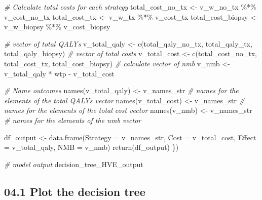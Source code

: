 \documentclass[
]{article}
\newenvironment{Shaded}{\begin{snugshade}}{\end{snugshade}}
\newcommand{\AttributeTok}[1]{\textcolor[rgb]{0.77,0.63,0.00}{#1}}
\newcommand{\CommentTok}[1]{\textcolor[rgb]{0.56,0.35,0.01}{\textit{#1}}}
\newcommand{\FunctionTok}[1]{\textcolor[rgb]{0.00,0.00,0.00}{#1}}
\newcommand{\NormalTok}[1]{#1}
\newcommand{\OtherTok}[1]{\textcolor[rgb]{0.56,0.35,0.01}{#1}}
\newcommand{\SpecialCharTok}[1]{\textcolor[rgb]{0.00,0.00,0.00}{#1}}
\begin{document}
\begin{Shaded}
\begin{Highlighting}[]
  \CommentTok{\# Calculate total costs for each strategy }
\NormalTok{  total\_cost\_no\_tx  }\OtherTok{\textless{}{-}}\NormalTok{ v\_w\_no\_tx  }\SpecialCharTok{\%*\%}\NormalTok{ v\_cost\_no\_tx    }
\NormalTok{  total\_cost\_tx     }\OtherTok{\textless{}{-}}\NormalTok{ v\_w\_tx     }\SpecialCharTok{\%*\%}\NormalTok{ v\_cost\_tx}
\NormalTok{  total\_cost\_biopsy }\OtherTok{\textless{}{-}}\NormalTok{ v\_w\_biopsy }\SpecialCharTok{\%*\%}\NormalTok{ v\_cost\_biopsy}
  
  \CommentTok{\# vector of total QALYs}
\NormalTok{  v\_total\_qaly }\OtherTok{\textless{}{-}} \FunctionTok{c}\NormalTok{(total\_qaly\_no\_tx, total\_qaly\_tx, total\_qaly\_biopsy) }
  \CommentTok{\# vector of total costs}
\NormalTok{  v\_total\_cost }\OtherTok{\textless{}{-}} \FunctionTok{c}\NormalTok{(total\_cost\_no\_tx, total\_cost\_tx, total\_cost\_biopsy) }
  \CommentTok{\# calculate vector of nmb}
\NormalTok{  v\_nmb        }\OtherTok{\textless{}{-}}\NormalTok{ v\_total\_qaly }\SpecialCharTok{*}\NormalTok{ wtp }\SpecialCharTok{{-}}\NormalTok{ v\_total\_cost                      }
  
  \CommentTok{\# Name outcomes}
  \FunctionTok{names}\NormalTok{(v\_total\_qaly) }\OtherTok{\textless{}{-}}\NormalTok{ v\_names\_str  }\CommentTok{\# names for the elements of the total QALYs vector}
  \FunctionTok{names}\NormalTok{(v\_total\_cost) }\OtherTok{\textless{}{-}}\NormalTok{ v\_names\_str  }\CommentTok{\# names for the elements of the total cost vector}
  \FunctionTok{names}\NormalTok{(v\_nmb)        }\OtherTok{\textless{}{-}}\NormalTok{ v\_names\_str  }\CommentTok{\# names for the elements of the nmb vector}
  
\NormalTok{  df\_output }\OtherTok{\textless{}{-}} \FunctionTok{data.frame}\NormalTok{(}\AttributeTok{Strategy =}\NormalTok{ v\_names\_str,}
                          \AttributeTok{Cost     =}\NormalTok{ v\_total\_cost,}
                          \AttributeTok{Effect   =}\NormalTok{ v\_total\_qaly,}
                          \AttributeTok{NMB      =}\NormalTok{ v\_nmb)}
  \FunctionTok{return}\NormalTok{(df\_output)}
\NormalTok{\})}

\CommentTok{\# model output}
\NormalTok{decision\_tree\_HVE\_output}
\end{Highlighting}
\end{Shaded}

\hypertarget{plot-the-decision-tree}{%
\subsection{04.1 Plot the decision tree}\label{plot-the-decision-tree}}
\end{document}
